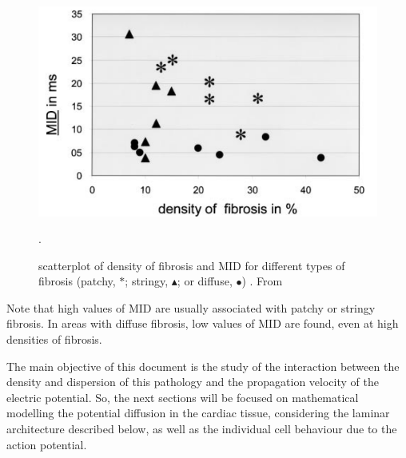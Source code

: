 \documentclass[letterpaper, twoside]{article}     	    %
\begin{document}
\begin{figure}[H]
	\centering
	\includegraphics[width= 8 cm]{fig/fundamentals-fib-midvsdensity}
	\caption{scatterplot of density of fibrosis and MID for different types of fibrosis (patchy, $*$; stringy, $\blacktriangle$; or diffuse, $\bullet$) . From \cite{Kawara2001Circ}}. \label{fig:midvsdensity}
\end{figure}

Note that high values of MID are usually associated with patchy or stringy fibrosis. In areas with diffuse fibrosis, low values of MID are found, even at high densities of fibrosis.

The main objective of this document is the study of the interaction between the density and dispersion of this pathology and the propagation velocity of the electric potential. So, the next sections will be focused on mathematical modelling the potential diffusion in the cardiac tissue, considering the laminar architecture described below, as well as the individual cell behaviour due to the action potential.
\end{document}
